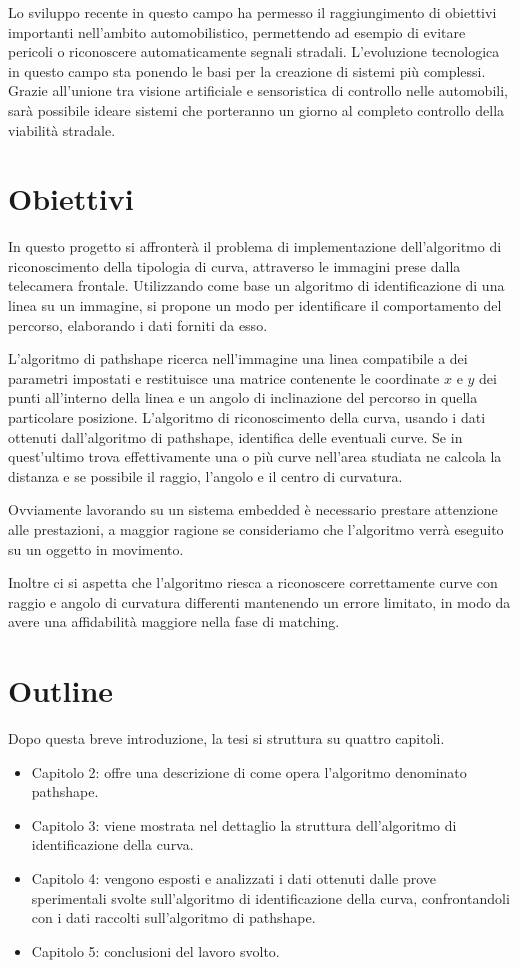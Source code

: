 	Lo sviluppo recente in questo campo ha permesso il raggiungimento di obiettivi importanti nell'ambito automobilistico, permettendo ad esempio di evitare pericoli o riconoscere automaticamente segnali stradali. L'evoluzione tecnologica in questo campo sta ponendo le basi per la creazione di sistemi più complessi. Grazie all'unione tra visione artificiale e sensoristica di controllo nelle automobili, sarà possibile ideare sistemi che porteranno un giorno al completo controllo della viabilità stradale.

\section{Obiettivi}

	In questo progetto si affronterà il problema di implementazione dell'algoritmo di riconoscimento della tipologia di curva, attraverso le immagini prese dalla telecamera frontale. Utilizzando come base un algoritmo di identificazione di una linea su un immagine, si propone un modo per identificare il comportamento del percorso, elaborando i dati forniti da esso.

	L'algoritmo di pathshape ricerca nell'immagine una linea compatibile a dei parametri impostati e restituisce una matrice contenente le coordinate $x$ e $y$ dei punti all'interno della linea e un angolo di inclinazione del percorso in quella particolare posizione. L'algoritmo di riconoscimento della curva, usando i dati ottenuti dall'algoritmo di pathshape, identifica delle eventuali curve. Se in quest'ultimo trova effettivamente una o più curve nell'area studiata ne calcola la distanza e se possibile il raggio, l'angolo e il centro di curvatura.

	Ovviamente lavorando su un sistema embedded è necessario prestare attenzione alle prestazioni, a maggior ragione se consideriamo che l'algoritmo verrà eseguito su un oggetto in movimento.

	Inoltre ci si aspetta che l'algoritmo riesca a riconoscere correttamente curve con raggio e angolo di curvatura differenti mantenendo un errore limitato, in modo da avere una affidabilità maggiore nella fase di matching.

\section{Outline}
	Dopo questa breve introduzione, la tesi si struttura su quattro capitoli.
	\begin{itemize}
		\item Capitolo 2: offre una descrizione di come opera l'algoritmo denominato pathshape.
		\item Capitolo 3: viene mostrata nel dettaglio la struttura dell'algoritmo di identificazione della curva.
		\item Capitolo 4: vengono esposti e analizzati i dati ottenuti dalle prove sperimentali svolte sull'algoritmo di identificazione della curva, confrontandoli con i dati raccolti sull'algoritmo di pathshape.
		\item Capitolo 5: conclusioni del lavoro svolto.
	\end{itemize}
